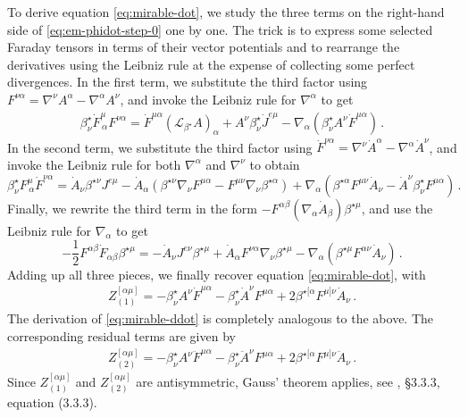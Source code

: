 \documentclass[
a4paper,
amsfonts,
amsmath,
reprint,
showkeys,
nofootinbib,
twoside,
onecolumn,
notitlepage
]{revtex4-1}
\begin{document}
	To derive equation \eqref{eq:mirable-dot}, we study the three terms on the right-hand side of \eqref{eq:em-phidot-step-0} one by one. The trick is to express some selected Faraday tensors in terms of their vector potentials and to rearrange the derivatives using the Leibniz rule at the expense of collecting some perfect divergences. In the first term, we substitute the third factor using $F^{\nu \alpha}=\nabla^\nu A^\alpha-\nabla^\alpha A^\nu$, and invoke the Leibniz rule for $\nabla^\alpha$ to get
	\begin{eqnarray}
		\beta^\star_\nu \dot{F}^{\mu}_{\,\alpha}F^{\nu\alpha} =\dot{F}^{\mu \alpha} (\mathcal{L}_{\beta^\star} A)_\alpha +A^\nu \beta^\star_\nu \dot{J}^{e\mu} - \nabla_\alpha (\beta^\star_\nu A^\nu\dot{F}^{\mu \alpha}) \, .
	\end{eqnarray}
	In the second term, we substitute the third factor using $\dot{F}^{\nu \alpha}=\nabla^\nu \dot{A}^\alpha-\nabla^\alpha \dot{A}^\nu$, and invoke the Leibniz rule for both $\nabla^\alpha$ and $\nabla^\nu$ to obtain
	\begin{equation}
		\beta^\star_\nu F^{\mu}_{\,\alpha}\dot{F}^{\nu\alpha} =\dot{A}_\nu \beta^{\star \nu} J^{e\mu}-\dot{A}_\alpha (\beta^{\star \nu}\nabla_\nu F^{\mu \alpha}-F^{\mu \nu}\nabla_\nu \beta^{\star\alpha}) + \nabla_\alpha(\beta^{\star \alpha}F^{\mu \nu}\dot{A}_\nu -\dot{A}^\nu \beta^\star_\nu F^{\mu \alpha}) \, .
	\end{equation}
	Finally, we rewrite the third term in the form $-F^{\alpha \beta}(\nabla_\alpha \dot{A}_\beta)\beta^{\star \mu}$, and use the Leibniz rule for $\nabla_\alpha$ to get
	\begin{equation}
		- \frac{1}{2}F^{\alpha \beta}\dot{F}_{\alpha \beta} \beta^{\star \mu} = -\dot{A}_\nu J^{e\nu} \beta^{\star \mu} + \dot{A}_\alpha F^{\nu \alpha}\nabla_\nu \beta^{\star \mu} - \nabla_\alpha(\beta^{\star \mu} F^{\alpha \nu} \dot{A}_\nu) \, .
	\end{equation}
	Adding up all three pieces, we finally recover equation \eqref{eq:mirable-dot}, with
	\begin{eqnarray}\label{eq:z1}
		Z_{(1)}^{[\alpha \mu]}= -\beta^\star_\nu A^\nu \dot{F}^{\mu \alpha} - \beta^\star_\nu \dot{A}^\nu F^{\mu \alpha} + 2\beta^{\star [\alpha}F^{\mu]\nu} \dot{A}_\nu \, .
	\end{eqnarray}
	The derivation of \eqref{eq:mirable-ddot} is completely analogous to the above. 
	The corresponding residual terms are given by
	\begin{eqnarray}\label{eq:z2}
		Z_{(2)}^{[\alpha \mu]}= -\beta^\star_\nu A^\nu \ddot{F}^{\mu \alpha} - \beta^\star_\nu \ddot{A}^\nu F^{\mu \alpha} + 2\beta^{\star [\alpha}F^{\mu]\nu} \ddot{A}_\nu \, .
	\end{eqnarray}
	Since $Z_{(1)}^{[\alpha \mu]}$ and $Z_{(2)}^{[\alpha \mu]}$ are antisymmetric, Gauss' theorem applies, see \citet{Poisson_notes}, \S 3.3.3, equation (3.3.3).
	\label{lastpage}
	
\end{document}
